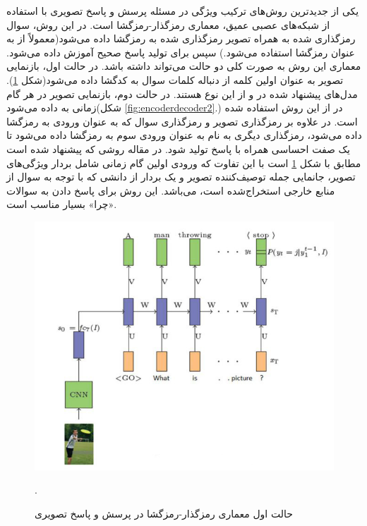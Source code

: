 یکی از جدیدترین‌ روش‌های ترکیب ویژگی در مسئله پرسش و پاسخ تصویری با استفاده از شبکه‌های عصبی عمیق، معماری رمزگذار-رمزگشا
است. در این روش، سوال رمزگذاری شده به همراه تصویر رمزگذاری شده به رمزگشا داده می‌شود(معمولاً از 
به عنوان رمزگشا استفاده می‌شود.) سپس برای تولید پاسخ صحیح آموزش داده می‌شود. معماری این روش به صورت کلی دو حالت می‌تواند داشته باشد. در حالت اول، بازنمایی تصویر به عنوان اولین کلمه از دنباله کلمات سوال به کدگشا داده می‌شود(شکل 
\ref{fig:encoderdecoder1}).
مدل‌های پیشنهاد شده در 
\cite{ren2015image}
و
\cite{zhu2016visual7w}
از این نوع هستند.  در حالت دوم، بازنمایی تصویر در هر گام زمانی به 
داده می‌شود(شکل
\ref{fig:encoderdecoder2}.)
در 
\cite{malinowski2017ask}
از این روش استفاده شده است. در 
\cite{ruwa2018affective}
علاوه بر رمزگذاری تصویر و رمزگذاری سوال که به عنوان ورودی به رمزگشا داده‌‌ می‌شود، رمزگذاری دیگری به نام
به عنوان ورودی سوم به رمزگشا داده می‌شود تا یک صفت احساسی همراه با پاسخ تولید شود. در مقاله
\cite{wu2017image}
روشی که پیشنهاد شده است مطابق با شکل 
\ref{fig:encoderdecoder1}
است با این تفاوت که ورودی اولین گام زمانی 
شامل بردار ویژگی‌های تصویر، جانمایی جمله توصیف‌کننده تصویر و یک بردار از دانشی که با توجه به سوال از منابع خارجی استخراج‌شده است، می‌باشد. این روش برای پاسخ دادن به سوالات «چرا» بسیار مناسب است.
\begin{figure}
	\centerline{\includegraphics[scale=0.4]{images/encoder-decoder1.JPG}}
	\caption{حالت اول معماری رمزگذار-رمزگشا در پرسش و پاسخ تصویری}.
	\label{fig:encoderdecoder1}
\end{figure}

